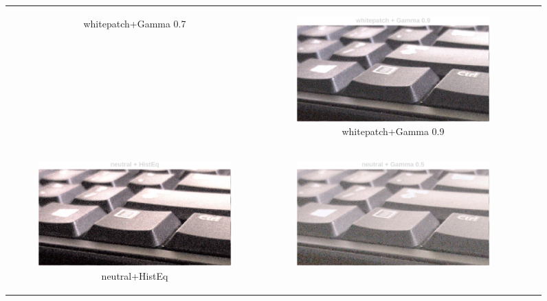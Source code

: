 \documentclass[11pt, a4]{article}
\begin{document}
\begin{enumerate}
\begin{enumerate}
\begin{figure}[h]
{\begin{tabular}{cccc}
\begin{subfigure}[h]{0.45\linewidth}
							\caption{whitepatch+Gamma 0.7}
							\label{fig:RawImage2_tone_7}
						\end{subfigure} &
						\begin{subfigure}[h]{0.45\linewidth}
							\centering
							\includegraphics[width=\linewidth]{../output/RawImage2_Tone_whitepatch_Gamma0.9.pdf}
							\caption{whitepatch+Gamma 0.9}
							\label{fig:RawImage2_tone_8}
						\end{subfigure}\\
						\begin{subfigure}[h]{0.45\linewidth}
							\centering
							\includegraphics[width=\linewidth]{../output/RawImage2_Tone_neutral_HistEq.pdf}
							\caption{neutral+HistEq}
							\label{fig:RawImage2_tone_9}
						\end{subfigure} &
						\begin{subfigure}[h]{0.45\linewidth}
							\centering
							\includegraphics[width=\linewidth]{../output/RawImage2_Tone_neutral_Gamma0.5.pdf}

\end{subfigure}
\end{tabular}}
\end{figure}
\end{enumerate}
\end{enumerate}
\end{document}

